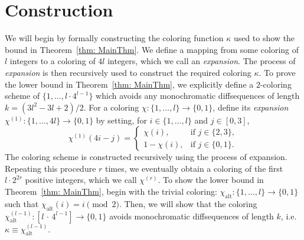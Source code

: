 \documentclass[10pt,a4paper]{amsart}
\def\mod{\!\pmod}
\begin{document}
\section{Construction}\label{sec: construction}
We will begin by formally constructing the coloring function $\kappa$ used to show the bound in Theorem~\ref{thm: MainThm}. We define a mapping from some coloring of $l$ integers to a coloring of $4l$ integers, which we call an \textit{expansion}. The process of \textit{expansion} is then recursively used to construct the required coloring $\kappa$. To prove the lower bound in Theorem~\ref{thm: MainThm}, we explicitly define a $2$-coloring scheme of $\{1,\ldots, l \cdot  4^{l-1}\}$ which avoids any monochromatic diffsequences of length $k = (3l^2-3l+2)/2$.  For a coloring $\chi \colon\{1,\ldots, l\} \to \{0,1\}$, define its \textit{expansion} $\chi^{(1)}\colon \{1,\ldots, 4l\} \to \{0,1\}$ by setting, for $i \in \{1, \ldots,  l\}$ and $j \in [0,3]$, 
\begin{equation}
\chi^{(1)}(4i - j) =
\begin{cases}
\chi(i), & \text{if } j \in \{2,3\}, \\
1 - \chi(i), & \text{if } j \in \{0,1\}.
\end{cases}
\end{equation}
The coloring scheme is constructed recursively using the process of expansion. Repeating this procedure $r$ times, we eventually obtain a coloring of the first $l \cdot 2^{2r}$ positive integers, which we call $\chi^{(r)}$. To show the lower bound in Theorem~\ref{thm: MainThm}, begin with the trivial coloring: $\chi_{\mathrm{alt}} \colon \{1,\ldots, l\} \to \{0,1\}$ such that $\chi_{\mathrm{alt}}(i) = i \mod{2}$. Then, we will show that the coloring $\chi_{\mathrm{alt}}^{(l-1)} \colon [ l \, \cdot \, 4^{l-1}] \to \{0,1\}$ avoids monochromatic diffsequences of length $k$, i.e. $\kappa \equiv  \chi_{\mathrm{alt}}^{(l-1)}$. 
\end{document}
